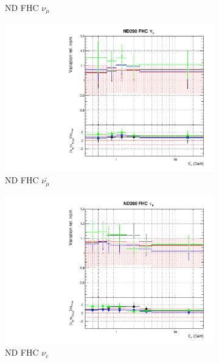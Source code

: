 \begin{figure}[!htbp]
\begin{subfigure}{0.49\textwidth}
  \caption{ND FHC $\nu_{\mu}$}
\end{subfigure}
\begin{subfigure}{0.49\textwidth}
  \centering
  \includegraphics[width=0.99\linewidth]{figs/detcovbinflux_1}
  \caption{ND FHC $\bar{\nu_{\mu}}$}
\end{subfigure}
\begin{subfigure}{0.49\textwidth}
  \centering
  \includegraphics[width=0.99\linewidth]{figs/detcovbinflux_2}
  \caption{ND FHC $\nu_e$}
\end{subfigure}
\begin{subfigure}{0.49\textwidth}
  \centering

\end{subfigure}
\end{figure}
